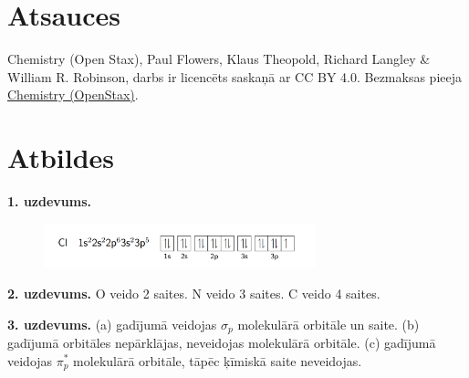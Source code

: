 \documentclass[12pt,a4paper]{article}
\begin{document}
\section*{Atsauces}

Chemistry (Open Stax), Paul Flowers, Klaus Theopold, Richard Langley \& William R. Robinson, darbs ir licencēts saskaņā ar CC BY 4.0. Bezmaksas pieeja \href{https://openstax.org/books/chemistry-2e/pages/1-introduction}{Chemistry (OpenStax)}.

\newpage
\section*{Atbildes}

\textbf{1. uzdevums.}
\begin{figure}[H]
    \centering
    \includegraphics[width=0.7\textwidth]{atteli/Cl.png}
\end{figure}

\textbf{2. uzdevums.}
 O veido 2 saites. N veido 3 saites. C veido 4 saites.

\textbf{3. uzdevums.}
(a) gadījumā veidojas $\sigma_p$ molekulārā orbitāle un saite. (b) gadījumā orbitāles nepārklājas, neveidojas molekulārā orbitāle. (c) gadījumā veidojas $\pi_p^*$ molekulārā orbitāle, tāpēc ķīmiskā saite neveidojas.
\end{document}
